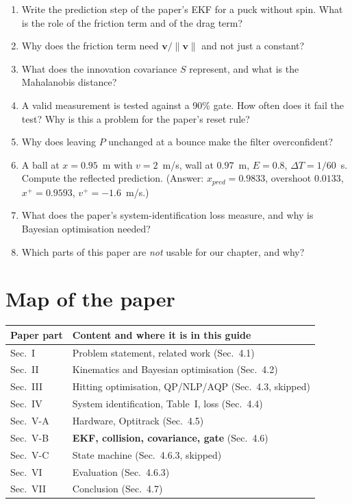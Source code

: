 \documentclass[11pt,a4paper]{article}
\newcommand{\vv}{\bm{v}}
\begin{document}
\begin{enumerate}
\item Write the prediction step of the paper's EKF for a puck without spin. What is the role of the
friction term and of the drag term?
\item Why does the friction term need $\vv/\|\vv\|$ and not just a constant?
\item What does the innovation covariance $S$ represent, and what is the Mahalanobis distance?
\item A valid measurement is tested against a 90\% gate. How often does it fail the test? Why is
this a problem for the paper's reset rule?
\item Why does leaving $P$ unchanged at a bounce make the filter overconfident?
\item A ball at $x=0.95$~m with $v=2$~m/s, wall at $0.97$~m, $E=0.8$, $\Delta T=1/60$~s. Compute
the reflected prediction. (Answer: $x_{pred}=0.9833$, overshoot $0.0133$, $x^+=0.9593$,
$v^+=-1.6$~m/s.)
\item What does the paper's system-identification loss measure, and why is Bayesian optimisation
needed?
\item Which parts of this paper are \emph{not} usable for our chapter, and why?
\end{enumerate}

\appendix
\section{Map of the paper}
\begin{center}
\small
\begin{tabularx}{\textwidth}{@{}l X@{}}
\toprule
Paper part & Content and where it is in this guide \\
\midrule
Sec.~I & Problem statement, related work (Sec.~4.1) \\
Sec.~II & Kinematics and Bayesian optimisation (Sec.~4.2) \\
Sec.~III & Hitting optimisation, QP/NLP/AQP (Sec.~4.3, skipped) \\
Sec.~IV & System identification, Table~I, loss (Sec.~4.4) \\
Sec.~V-A & Hardware, Optitrack (Sec.~4.5) \\
Sec.~V-B & \textbf{EKF, collision, covariance, gate} (Sec.~4.6) \\
Sec.~V-C & State machine (Sec.~4.6.3, skipped) \\
Sec.~VI & Evaluation (Sec.~4.6.3) \\
Sec.~VII & Conclusion (Sec.~4.7) \\
\bottomrule
\end{tabularx}
\end{center}
\end{document}
